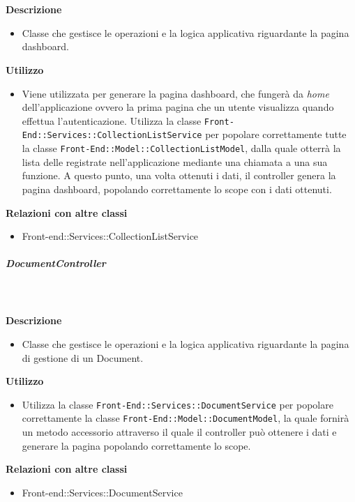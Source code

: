 				\textbf{\\ \\ Descrizione} 
					\begin{itemize}
						\item[] Classe che gestisce le operazioni e la logica applicativa riguardante la pagina dashboard.
					\end{itemize}      
				\textbf{Utilizzo}  
					\begin{itemize}
						\item[] Viene utilizzata per generare la pagina dashboard, che fungerà da \textit{home} dell'applicazione ovvero la prima pagina che un utente visualizza quando effettua l'autenticazione. Utilizza la classe \texttt{Front-End::Services::CollectionListService} per popolare correttamente tutte la classe \texttt{Front-End::Model::CollectionListModel}, dalla quale otterrà la lista delle  registrate nell'applicazione mediante una chiamata a una sua funzione. A questo punto, una volta ottenuti i dati, il controller genera la pagina dashboard, popolando correttamente lo scope con i dati ottenuti.
					\end{itemize}
					\textbf{Relazioni con altre classi}
					\begin{itemize}
							\item{Front-end::Services::CollectionListService}
					\end{itemize}
			\subparagraph{DocumentController}
				
				\textbf{\\ \\ Descrizione} 
					\begin{itemize}
						\item[] Classe che gestisce le operazioni e la logica applicativa riguardante la pagina di gestione di un Document.
					\end{itemize}      
				\textbf{Utilizzo}  
					\begin{itemize}
						\item[] Utilizza la classe \texttt{Front-End::Services::DocumentService} per popolare correttamente la classe \texttt{Front-End::Model::DocumentModel}, la quale fornirà un metodo accessorio attraverso il quale il controller può ottenere i dati e generare la pagina popolando correttamente lo scope.
					\end{itemize}
					\textbf{Relazioni con altre classi}
					\begin{itemize}
							\item{Front-end::Services::DocumentService}
					\end{itemize}
